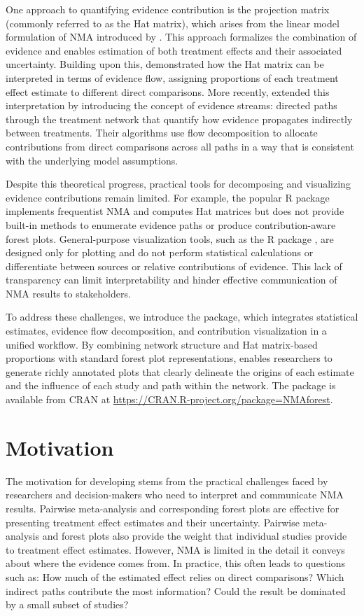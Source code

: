 One approach to quantifying evidence contribution is the projection matrix (commonly referred to as the Hat matrix), which arises from the linear model formulation of NMA introduced by \citet{Lu2011}. This approach formalizes the combination of evidence and enables estimation of both treatment effects and their associated uncertainty. Building upon this, \citet{Konig2013} demonstrated how the Hat matrix can be interpreted in terms of evidence flow, assigning proportions of each treatment effect estimate to different direct comparisons. More recently, \citet{Papakonstantinou2018} extended this interpretation by introducing the concept of evidence streams: directed paths through the treatment network that quantify how evidence propagates indirectly between treatments. Their algorithms use flow decomposition to allocate contributions from direct comparisons across all paths in a way that is consistent with the underlying model assumptions.

Despite this theoretical progress, practical tools for decomposing and visualizing evidence contributions remain limited. For example, the popular  R package \citep{netmeta-jss} implements frequentist NMA and computes Hat matrices but does not provide built-in methods to enumerate evidence paths or produce contribution-aware forest plots. General-purpose visualization tools, such as the R package  \citep{forestplot-pkg}, are designed only for plotting and do not perform statistical calculations or differentiate between sources or relative contributions of evidence. This lack of transparency can limit interpretability and hinder effective communication of NMA results to stakeholders.

To address these challenges, we introduce the  package, which integrates statistical estimates, evidence flow decomposition, and contribution visualization in a unified workflow. By combining network structure and Hat matrix-based proportions with standard forest plot representations,  enables researchers to generate richly annotated plots that clearly delineate the origins of each estimate and the influence of each study and path within the network. The  package is available from CRAN at \url{https://CRAN.R-project.org/package=NMAforest}.

\section{Motivation}
The motivation for developing  stems from the practical challenges faced by researchers and decision-makers who need to interpret and communicate NMA results. Pairwise meta-analysis and corresponding forest plots are effective for presenting treatment effect estimates and their uncertainty. Pairwise meta-analysis and forest plots also provide the weight that individual studies provide to treatment effect estimates. However, NMA is limited in the detail it conveys about where the evidence comes from. In practice, this often leads to questions such as: How much of the estimated effect relies on direct comparisons? Which indirect paths contribute the most information? Could the result be dominated by a small subset of studies?

